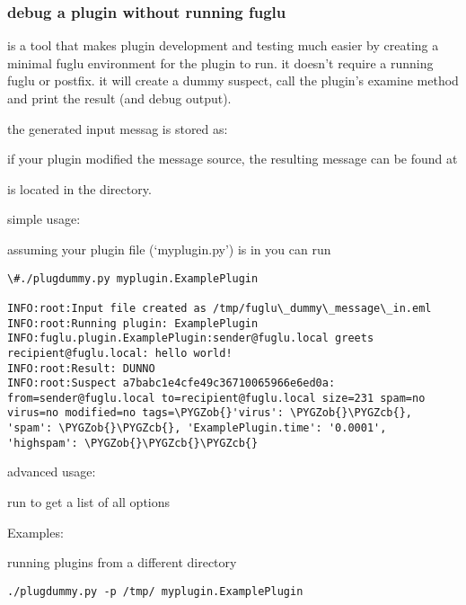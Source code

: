 \documentclass[letterpaper,10pt,english]{sphinxmanual}
\def\PYGZob{\char`\{}
\def\PYGZcb{\char`\}}
\begin{document}
\subsubsection{debug a plugin without running fuglu}
\label{plugins-index:debug-a-plugin-without-running-fuglu}
 is a tool that makes plugin development and testing much easier by creating a minimal fuglu environment for the plugin to run. it doesn't require a running fuglu or postfix. it will create a dummy suspect, call the plugin's examine method and print the result (and debug output).

the generated input messag is stored as: 

if your plugin modified the message source, the resulting message can be found at 

 is located in the  directory.

simple usage:

assuming your plugin file (`myplugin.py') is in  you can run 

\begin{Verbatim}[commandchars=\\\{\}]
\#./plugdummy.py myplugin.ExamplePlugin

INFO:root:Input file created as /tmp/fuglu\_dummy\_message\_in.eml
INFO:root:Running plugin: ExamplePlugin
INFO:fuglu.plugin.ExamplePlugin:sender@fuglu.local greets recipient@fuglu.local: hello world!
INFO:root:Result: DUNNO
INFO:root:Suspect a7babc1e4cfe49c36710065966e6ed0a: from=sender@fuglu.local to=recipient@fuglu.local size=231 spam=no virus=no modified=no tags=\PYGZob{}'virus': \PYGZob{}\PYGZcb{}, 'spam': \PYGZob{}\PYGZcb{}, 'ExamplePlugin.time': '0.0001', 'highspam': \PYGZob{}\PYGZcb{}\PYGZcb{}
\end{Verbatim}

advanced usage:

run  to get a list of all options

Examples:

running plugins from a different directory

\begin{Verbatim}[commandchars=\\\{\}]
./plugdummy.py -p /tmp/ myplugin.ExamplePlugin
\end{Verbatim}
\end{document}
